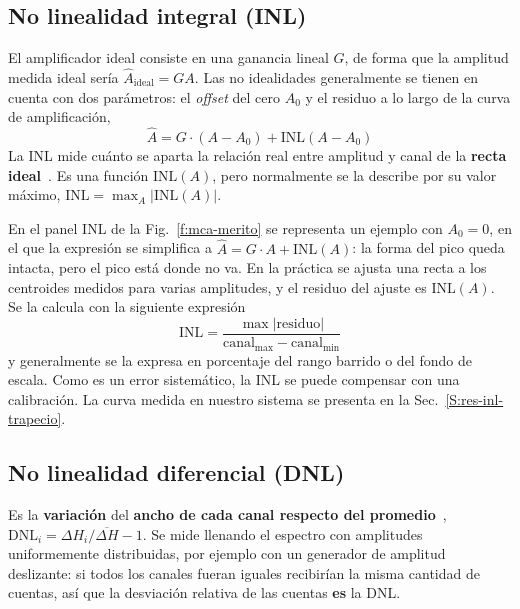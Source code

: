 \subsection{No linealidad integral (INL)}
\label{S:mca-inl}

El amplificador ideal consiste en una ganancia lineal $G$, de forma que la
amplitud medida ideal sería $\hat A_\text{ideal} = G A$. Las no idealidades
generalmente se tienen en cuenta con dos parámetros: el \emph{offset} del cero $A_0$ y
el residuo a lo largo de la curva de amplificación,
\begin{equation}
  \hat A = G \cdot (A-A_0) + \text{INL}(A-A_0)
  \label{e:mca-inl}
\end{equation}
La INL mide cuánto se aparta la relación real entre amplitud y canal de la
\textbf{recta ideal}~\cite{IEEE1241}. Es una función $\text{INL}(A)$, pero
normalmente se la describe por su valor máximo,
$\text{INL} = \max_A |\text{INL}(A)|$.

En el panel INL de la Fig.~\ref{f:mca-merito} se representa un ejemplo con
$A_0 = 0$, en el que la expresión se simplifica a
$\hat A = G \cdot A + \text{INL}(A)$: la forma del pico queda intacta, pero el
pico está donde no va. En la práctica se ajusta una recta a los centroides
medidos para varias amplitudes, y el residuo del ajuste es $\text{INL}(A)$. Se
la calcula con la siguiente expresión
\begin{equation}
  \text{INL} = \frac{\max|\text{residuo}|}{\text{canal}_{\max} - \text{canal}_{\min}}
  \label{e:mca-inl-max}
\end{equation}
y generalmente se la expresa en porcentaje del rango barrido o del fondo de
escala. Como es un error sistemático, la INL se puede compensar con una
calibración. La curva medida en nuestro sistema se presenta en la
Sec.~\ref{S:res-inl-trapecio}.

\subsection{No linealidad diferencial (DNL)}
\label{S:mca-dnl}

Es la \textbf{variación} del \textbf{ancho de cada canal respecto del
promedio}~\cite{IEEE1241},
$\text{DNL}_i = \Delta H_i / \overline{\Delta H} - 1$. Se mide llenando el
espectro con amplitudes uniformemente distribuidas, por ejemplo con un
generador de amplitud deslizante: si todos los canales fueran iguales recibirían
la misma cantidad de cuentas, así que la desviación relativa de las cuentas
\textbf{es} la DNL.

